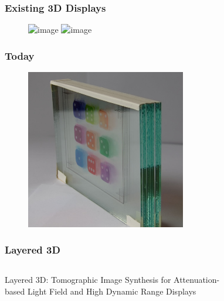 \documentclass[12pt, compress]{beamer}
\begin{document}
\begin{frame}[fragile]
	\frametitle{Existing 3D Displays}
	
	\begin{figure}
		\includegraphics<1>[width=5cm]{figures/overview_displays/3d_glasses}
		\includegraphics<2>[width=5cm]{figures/overview_displays/no_3d_glasses}
	\end{figure}

\end{frame}

\begin{frame}[fragile]
	\frametitle{Today}
	
	\begin{figure}
		\includegraphics[height=7cm]{images/glass_plates_front_view_cropped}
	\end{figure}
\end{frame}

\begin{frame}[fragile]
	\frametitle{Layered 3D}

	\begin{columns}[onlytextwidth]
			\begin{block}{}
				Layered 3D: Tomographic Image Synthesis for Attenuation-based Light Field and High Dynamic Range Displays
			\end{block}
			\begin{block}{}
				\cite{WetzsteinTomo}
			\end{block}
			\begin{figure}
			\end{figure}
	\end{columns}
	
\end{frame}
\end{document}
